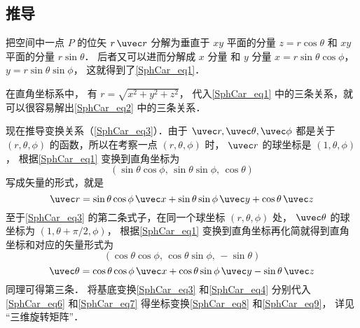 \subsection{推导}
把空间中一点 $P$ 的位矢 $r \,\uvec r$ 分解为垂直于 $xy$ 平面的分量 $z = r\cos \theta $ 和 $xy$ 平面的分量 $r\sin \theta $． 后者又可以进而分解成 $x$ 分量 和 $y$ 分量  $x = r\sin \theta \cos \phi$，  $y = r\sin \theta \sin \phi$， 这就得到了\autoref{SphCar_eq1}．

在直角坐标系中， 有 $r = \sqrt {x^2 + y^2 + z^2}$， 代入\autoref{SphCar_eq1} 中的三条关系，就可以很容易解出\autoref{SphCar_eq2} 中的三条关系．

现在推导变换关系（\autoref{SphCar_eq3}）．由于 $\uvec r,\uvec \theta ,\uvec \phi $ 都是关于 $(r, \theta, \phi)$ 的函数，所以在考察一点 $(r, \theta, \phi)$ 时， $\uvec r$ 的球坐标是 $(1, \theta, \phi)$，  根据\autoref{SphCar_eq1} 变换到直角坐标为
\begin{equation}
(\sin \theta \cos \phi,\,\sin \theta \sin \phi,\,\cos \theta)
\end{equation}
写成矢量的形式，就是
 \begin{equation}
\uvec r = \sin \theta \cos \phi \,\uvec x + \sin \theta \sin \phi \,\uvec y + \cos \theta \,\uvec z
\end{equation}
至于\autoref{SphCar_eq3} 的第二条式子，在同一个球坐标 $(r,\theta ,\phi)$ 处， $\uvec \theta $ 的球坐标为 $(1, \theta + \pi /2, \phi)$， 根据\autoref{SphCar_eq1} 变换到直角坐标再化简就得到直角坐标和对应的矢量形式为
\begin{equation}\label{SphCar_eq10}
(\cos \theta \cos \phi ,\,\cos \theta \sin \phi , \,- \sin \theta)
\end{equation}
\begin{equation}
\uvec \theta  = \cos \theta \cos \phi \,\uvec x + \cos \theta \sin \phi \,\uvec y - \sin \theta \,\uvec z
\end{equation}
同理可得第三条． 将基底变换\autoref{SphCar_eq3} 和\autoref{SphCar_eq4} 分别代入\autoref{SphCar_eq6} 和\autoref{SphCar_eq7} 得坐标变换\autoref{SphCar_eq8} 和\autoref{SphCar_eq9}， 详见 “三维旋转矩阵”．

